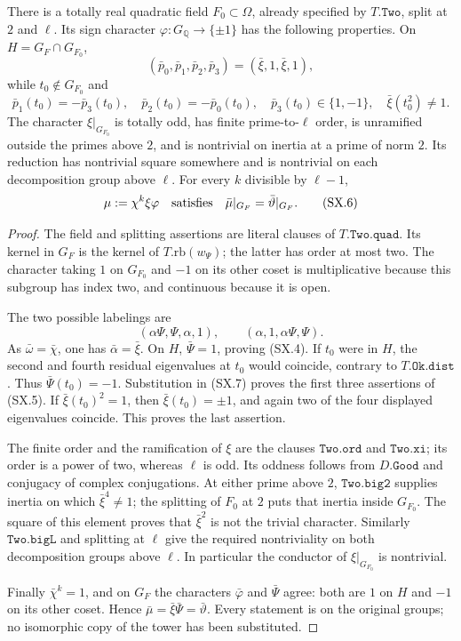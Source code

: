 \begin{proposition}
\label{claim:SX1}
There is a totally real quadratic field $F_0\subset\Omega$, already
specified by $T.\texttt{Two}$, split at $2$ and $\ell$.  Its sign
character $\varphi:G_{\mathbb Q}\to\{\pm1\}$ has the following
properties.  On $H=G_F\cap G_{F_0}$,
\[
 (\bar p_0,\bar p_1,\bar p_2,\bar p_3)
       =(\bar\xi,1,\bar\xi,1),                    \tag{SX.4}
\]
while $t_0\notin G_{F_0}$ and
\[
 \bar p_1(t_0)=-\bar p_3(t_0),\quad
 \bar p_2(t_0)=-\bar p_0(t_0),\quad
 \bar p_3(t_0)\in\{1,-1\},\quad
 \bar\xi(t_0^2)\ne1.                              \tag{SX.5}
\]
The character $\xi|_{G_{F_0}}$ is totally odd, has finite
prime-to-$\ell$ order, is unramified outside the primes above $2$,
and is nontrivial on inertia at a prime of norm $2$.  Its reduction
has nontrivial square somewhere and is nontrivial on each
decomposition group above $\ell$.
For every $k$ divisible by $\ell-1$,
\[
 \mu:=\chi^k\xi\varphi
       \quad\hbox{satisfies}\quad
 \bar\mu|_{G_F}=\bar\vartheta|_{G_F}.              \tag{SX.6}
\]
\end{proposition}
\begin{proof}
The field and splitting assertions are literal clauses of
$T.\texttt{Two.quad}$.  Its kernel in $G_F$ is the kernel of
$T.\mathrm{rb}(w_{\Psi})$; the latter has order at most two.
The character taking $1$ on $G_{F_0}$ and $-1$ on its other coset
is multiplicative because this subgroup has index two, and continuous
because it is open.

The two possible labelings are
\[
 (\alpha\Psi,\Psi,\alpha,1),\qquad
 (\alpha,1,\alpha\Psi,\Psi).                        \tag{SX.7}
\]
As $\bar\omega=\bar\chi$, one has $\bar\alpha=\bar\xi$.
On $H$, $\bar\Psi=1$, proving (SX.4).  If $t_0$ were in $H$,
the second and fourth residual eigenvalues at $t_0$ would coincide,
contrary to $T.\texttt{Ok.dist}$.  Thus $\bar\Psi(t_0)=-1$.
Substitution in (SX.7) proves the first three assertions of (SX.5).
If $\bar\xi(t_0)^2=1$, then $\bar\xi(t_0)=\pm1$, and again two
of the four displayed eigenvalues coincide.  This proves the last
assertion.

The finite order and the ramification of $\xi$ are the clauses
$\texttt{Two.ord}$ and $\texttt{Two.xi}$; its order is a power of
two, whereas $\ell$ is odd.  Its oddness follows from $D.\texttt{Good}$
and conjugacy of complex conjugations.  At either prime above $2$,
$\texttt{Two.big2}$ supplies inertia on which
$\bar\xi^4\ne1$; the splitting of $F_0$ at $2$ puts that inertia
inside $G_{F_0}$.  The square of this element proves that
$\bar\xi^2$ is not the trivial character.  Similarly
$\texttt{Two.bigL}$ and splitting at $\ell$ give the required
nontriviality on both decomposition groups above $\ell$.
In particular the conductor of $\xi|_{G_{F_0}}$ is nontrivial.

Finally $\bar\chi^k=1$, and on $G_F$ the characters $\bar\varphi$
and $\bar\Psi$ agree: both are $1$ on $H$ and $-1$ on its other
coset.  Hence $\bar\mu=\bar\xi\bar\Psi=\bar\vartheta$.
Every statement is on the original groups; no isomorphic copy of
the tower has been substituted.
\end{proof}

